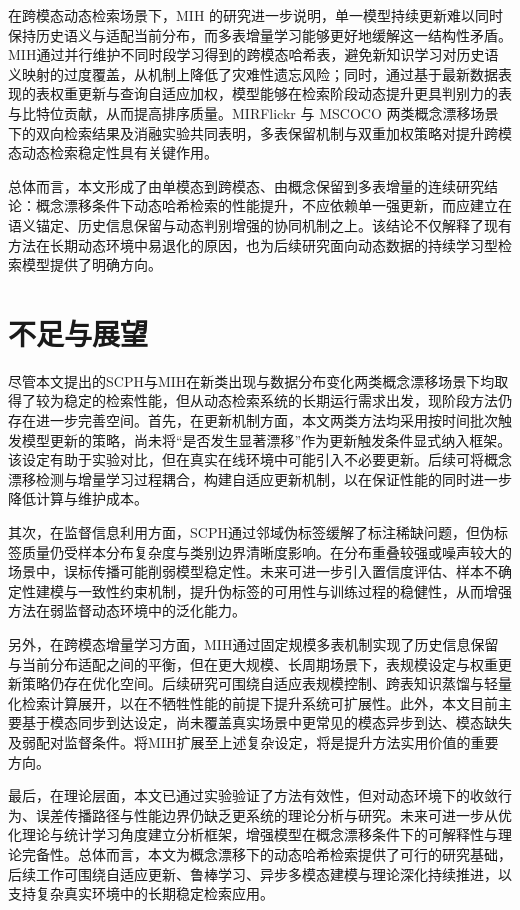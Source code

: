 在跨模态动态检索场景下，MIH 的研究进一步说明，单一模型持续更新难以同时保持历史语义与适配当前分布，而多表增量学习能够更好地缓解这一结构性矛盾。MIH通过并行维护不同时段学习得到的跨模态哈希表，避免新知识学习对历史语义映射的过度覆盖，从机制上降低了灾难性遗忘风险；同时，通过基于最新数据表现的表权重更新与查询自适应加权，模型能够在检索阶段动态提升更具判别力的表与比特位贡献，从而提高排序质量。MIRFlickr 与 MSCOCO 两类概念漂移场景下的双向检索结果及消融实验共同表明，多表保留机制与双重加权策略对提升跨模态动态检索稳定性具有关键作用。

总体而言，本文形成了由单模态到跨模态、由概念保留到多表增量的连续研究结论：概念漂移条件下动态哈希检索的性能提升，不应依赖单一强更新，而应建立在语义锚定、历史信息保留与动态判别增强的协同机制之上。该结论不仅解释了现有方法在长期动态环境中易退化的原因，也为后续研究面向动态数据的持续学习型检索模型提供了明确方向。

\section{不足与展望}
尽管本文提出的SCPH与MIH在新类出现与数据分布变化两类概念漂移场景下均取得了较为稳定的检索性能，但从动态检索系统的长期运行需求出发，现阶段方法仍存在进一步完善空间。首先，在更新机制方面，本文两类方法均采用按时间批次触发模型更新的策略，尚未将“是否发生显著漂移”作为更新触发条件显式纳入框架。该设定有助于实验对比，但在真实在线环境中可能引入不必要更新。后续可将概念漂移检测与增量学习过程耦合，构建自适应更新机制，以在保证性能的同时进一步降低计算与维护成本。

其次，在监督信息利用方面，SCPH通过邻域伪标签缓解了标注稀缺问题，但伪标签质量仍受样本分布复杂度与类别边界清晰度影响。在分布重叠较强或噪声较大的场景中，误标传播可能削弱模型稳定性。未来可进一步引入置信度评估、样本不确定性建模与一致性约束机制，提升伪标签的可用性与训练过程的稳健性，从而增强方法在弱监督动态环境中的泛化能力。

另外，在跨模态增量学习方面，MIH通过固定规模多表机制实现了历史信息保留与当前分布适配之间的平衡，但在更大规模、长周期场景下，表规模设定与权重更新策略仍存在优化空间。后续研究可围绕自适应表规模控制、跨表知识蒸馏与轻量化检索计算展开，以在不牺牲性能的前提下提升系统可扩展性。此外，本文目前主要基于模态同步到达设定，尚未覆盖真实场景中更常见的模态异步到达、模态缺失及弱配对监督条件。将MIH扩展至上述复杂设定，将是提升方法实用价值的重要方向。

最后，在理论层面，本文已通过实验验证了方法有效性，但对动态环境下的收敛行为、误差传播路径与性能边界仍缺乏更系统的理论分析与研究。未来可进一步从优化理论与统计学习角度建立分析框架，增强模型在概念漂移条件下的可解释性与理论完备性。总体而言，本文为概念漂移下的动态哈希检索提供了可行的研究基础，后续工作可围绕自适应更新、鲁棒学习、异步多模态建模与理论深化持续推进，以支持复杂真实环境中的长期稳定检索应用。
